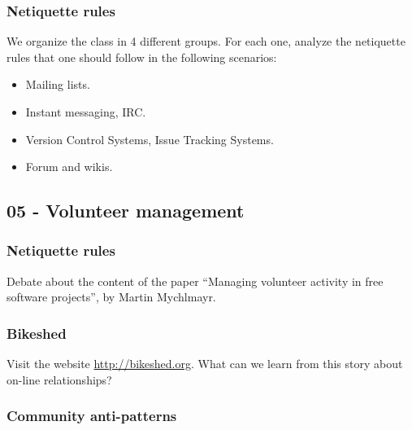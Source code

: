 \documentclass[a4paper]{article}
\begin{document}
\subsubsection{Netiquette rules}
\label{sub:netiquette}

We organize the class in 4 different groups. For each one, analyze the netiquette rules that one should follow in the following
scenarios:

\begin{itemize}
 \item Mailing lists.
 \item Instant messaging, IRC.
 \item Version Control Systems, Issue Tracking Systems.
 \item Forum and wikis.
\end{itemize}

\subsection{05 - Volunteer management}

\subsubsection{Netiquette rules}
\label{sub:manage-volunteer}

Debate about the content of the paper ``Managing volunteer activity in free software projects'', by Martin
Mychlmayr.

\subsubsection{Bikeshed}
\label{sub:bikeshed}

Visit the website \url{http://bikeshed.org}. What can we learn from this story about on-line relationships?

\subsubsection{Community anti-patterns}
\label{sub:anti-patterns}
\end{document}
